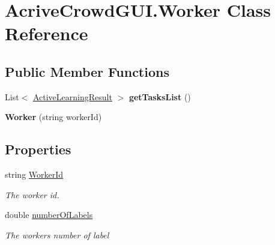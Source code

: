 \hypertarget{class_acrive_crowd_g_u_i_1_1_worker}{}\section{Acrive\+Crowd\+G\+U\+I.\+Worker Class Reference}
\label{class_acrive_crowd_g_u_i_1_1_worker}
\subsection*{Public Member Functions}
\begin{DoxyCompactItemize}
\item 
\hypertarget{class_acrive_crowd_g_u_i_1_1_worker_a5fa9372dcce7fb21cae9fbfded91c764}{}List$<$ \hyperlink{class_crowdsourcing_models_1_1_active_learning_result}{Active\+Learning\+Result} $>$ {\bfseries get\+Tasks\+List} ()\label{class_acrive_crowd_g_u_i_1_1_worker_a5fa9372dcce7fb21cae9fbfded91c764}

\item 
\hypertarget{class_acrive_crowd_g_u_i_1_1_worker_a464d7b16d153582de34148f94087db06}{}{\bfseries Worker} (string worker\+Id)\label{class_acrive_crowd_g_u_i_1_1_worker_a464d7b16d153582de34148f94087db06}

\end{DoxyCompactItemize}
\subsection*{Properties}
\begin{DoxyCompactItemize}
\item 
string \hyperlink{class_acrive_crowd_g_u_i_1_1_worker_a9efedfde6219e41d78794df6e689f846}{Worker\+Id}
\begin{DoxyCompactList}\small\item\em The worker id. \end{DoxyCompactList}\item 
double \hyperlink{class_acrive_crowd_g_u_i_1_1_worker_a88952a01ff62c123eccb375987d37b74}{number\+Of\+Labels}
\begin{DoxyCompactList}\small\item\em The worker\textquotesingle{}s number of label \end{DoxyCompactList}\end{DoxyCompactItemize}


